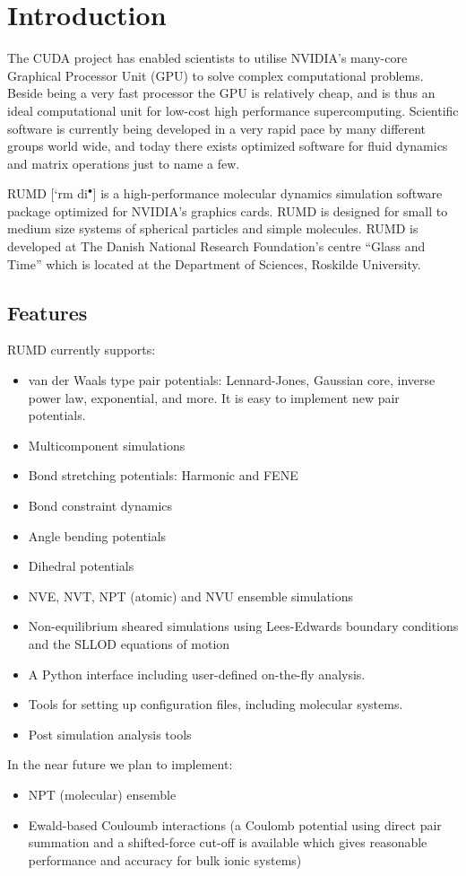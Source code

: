 

%

\section{Introduction}
The CUDA project has enabled scientists to utilise NVIDIA's many-core
Graphical Processor Unit (GPU) to solve complex computational
problems. Beside being a very fast processor the GPU is relatively
cheap, and is thus an ideal computational unit for low-cost high
performance supercomputing. Scientific software is currently being
developed in a very rapid pace by many different groups world wide,
and today there exists optimized software for fluid dynamics and
matrix operations just to name a few.   

RUMD [`r\textopeno m di\normalsize$^\bullet$]  
is a high-performance molecular dynamics simulation software package
optimized for NVIDIA's graphics cards. RUMD is designed for small to
medium size systems of spherical particles and simple molecules. RUMD
is developed at The Danish National Research Foundation's centre 
``Glass and Time'' which is located at the Department of Sciences,
Roskilde University.   

\subsection{Features}
RUMD currently supports: 
\begin{itemize}
\item van der Waals type pair potentials: Lennard-Jones, Gaussian
  core, inverse power law, exponential, and more. It is easy to implement new pair
  potentials. 
\item Multicomponent simulations
\item Bond stretching potentials: Harmonic and FENE
\item Bond constraint dynamics
\item Angle bending potentials
\item Dihedral  potentials
\item NVE, NVT, NPT (atomic) and NVU  ensemble simulations
\item Non-equilibrium sheared simulations using Lees-Edwards boundary conditions and the SLLOD equations of motion
\item A Python interface including user-defined on-the-fly analysis.
\item Tools for setting up configuration files, including molecular systems.
\item Post simulation analysis tools
\end{itemize}
In the near future we plan to implement:
\begin{itemize}
\item NPT (molecular) ensemble 
\item Ewald-based Couloumb interactions (a Coulomb potential using direct pair summation and a shifted-force cut-off is available which gives reasonable performance and accuracy for bulk ionic systems)
\end{itemize}

